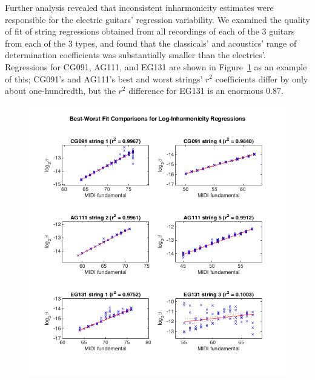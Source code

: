 \documentclass[12pt]{cmuthesis}
\begin{document}
Further analysis revealed that inconsistent inharmonicity estimates were responsible for the electric guitars' regression variability. We examined the quality of fit of string regressions obtained from all recordings of each of the 3 guitars from each of the 3 types, and found that the classicals' and acoustics' range of determination coefficients was substantially smaller than the electrics'. Regressions for CG091, AG111, and EG131 are shown in Figure~\ref{fig:best-worst-r2} as an example of this; CG091's and AG111's best and worst strings' $r^2$ coefficients differ by only about one-hundredth, but the $r^2$ difference for EG131 is an enormous $0.87$.

\begin{figure}[!htbp] 
\label{fig:best-worst-r2}
\centering
\includegraphics[scale=0.75]{best-worst-r2}
\caption{}
\end{figure}
\end{document}
